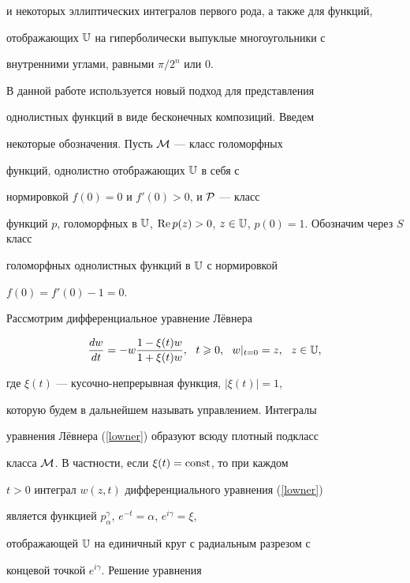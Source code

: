 и некоторых эллиптических интегралов первого рода, а также для функций, 


отображающих $\Bbb U$ на гиперболически выпуклые многоугольники  с


внутренними углами, равными $\pi/2^n$ или $0$.





В данной работе используется новый подход для представления


однолистных функций в виде бесконечных композиций. Введем


некоторые обозначения. Пусть $\cal M$ --- класс голоморфных


функций, однолистно отображающих $\Bbb U$ в себя с


нормировкой $f(0)=0$ и $f'(0)>0$, и $\cal P$ --- класс


функций $p$, голоморфных в $\Bbb U$, $\re


p(z)>0$, $z\in \Bbb{U}$, $p(0)=1$. Обозначим через $S$ класс


голоморфных однолистных функций в $\Bbb U$ с нормировкой


$f(0)=f'(0)-1=0$.





Рассмотрим дифференциальное уравнение Л\"евнера


\begin{equation}


\frac{dw}{dt}=-w\frac{1-\xi(t) w}{1+\xi(t) w},\ \ t\geqslant0,


\ \ w|_{t=0}=z,\ \ z\in\Bbb U, \label{lowner}


\end{equation}


где $\xi(t)$ --- кусочно-непрерывная функция, $|\xi(t)|=1$,


которую будем в дальнейшем называть управлением. Интегралы


уравнения Л\"евнера (\ref{lowner}) образуют всюду плотный подкласс


класса $\cal M$. В частности, если $\xi(t)=\operatorname{const}$, то при каждом


$t>0$ интеграл $w(z,t)$ дифференциального уравнения (\ref{lowner})


является функцией $p_\alpha^\gamma$, $e^{-t}=\alpha$, $e^{i\gamma}=\xi$,


отображающей $\Bbb U$ на единичный круг с радиальным разрезом с


концевой точкой $e^{i\gamma}$. Решение уравнения


